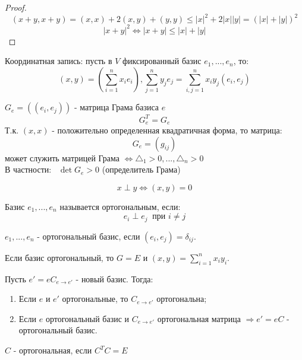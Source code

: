 \begin{proof}
    $$(x+y, x+y) = (x, x) + 2(x, y) + (y, y) \leq |x|^2 + 2|x||y| = (|x|+|y|)^2$$
    $$|x+y|^2 \Longleftrightarrow |x+y| \leq |x| + |y|$$  
\end{proof}
Координатная запись: пусть в $V$ фиксированный базис $e_1,...,e_n$, то: 
$$(x,y) = (\sum \limits_{i=1}^nx_ie_i), \sum \limits_{j=1}^ny_je_j = \sum \limits_{i,j=1}^nx_iy_j(e_i,e_j)$$
\begin{definition}
    $G_e = ((e_i,e_j))$ - матрица Грама базиса $e$
    $$G_e^T = G_e$$ 
    Т.к. $(x,x)$ - положительно определенная квадратичная форма, то матрица: 
    $$G_e = (g_{ij})$$ 
    может служить матрицей Грама $\Longleftrightarrow \triangle_1 >0,...,\triangle_n > 0$ \\
    В частности: \ $\det G_e >0$ (определитель Грама)   
\end{definition}
\begin{center}
\end{center}
\begin{definition}
    $$x \perp y \Longleftrightarrow (x,y) = 0$$ 
\end{definition}
\begin{definition}
    Базис $e_1,...,e_n$ называется ортогональным, если: 
    $$e_i \perp e_j \ \text{ при } i \neq j$$
\end{definition}
\begin{consequense}
    $e_1,...,e_n$ - ортогональный базис, если $(e_i,e_j) = \delta_{ij}$.  
\end{consequense}
\begin{consequense}
    Если базис ортогональный, то $G = E$ и $(x,y) = \sum \limits_{i=1}^nx_iy_i$.
\end{consequense}
\begin{theorem} Пусть $e' = eC_{e\to e'}$ - новый базис. Тогда: 
    \begin{enumerate}
        \item Если $e$ и $e'$ ортогональные, то $C_{e \to e'}$ ортогональна;
        \item Если $e$ ортогональный базис и $C_{e \to e'}$ ортогональная матрица $\Longrightarrow e' = eC$ - ортогональный базис.
    \end{enumerate}
\end{theorem}
\begin{remark}
    $C$ - ортогональная, если $C^TC = E$  
\end{remark} 
